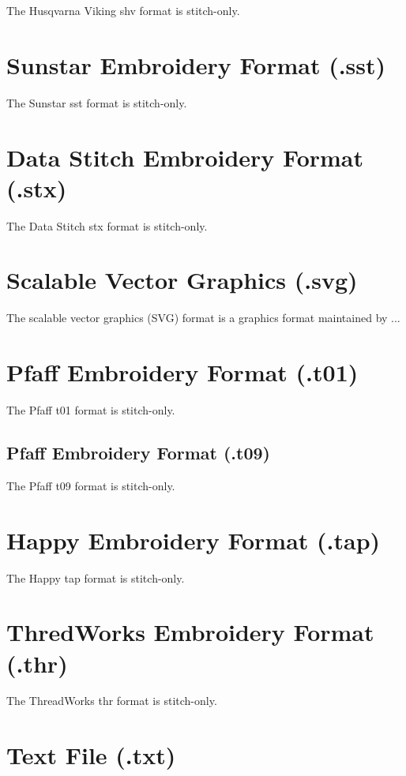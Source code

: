 \documentclass{report}
\begin{document}
The Husqvarna Viking shv format is stitch-only.

\section{Sunstar Embroidery Format (.sst)}

The Sunstar sst format is stitch-only.

\section{Data Stitch Embroidery Format (.stx)}

The Data Stitch stx format is stitch-only.

\section{Scalable Vector Graphics (.svg)}

The scalable vector graphics (SVG) format is a graphics format
maintained by ...

\section{Pfaff Embroidery Format (.t01)}

The Pfaff t01 format is stitch-only.

\subsection{Pfaff Embroidery Format (.t09)}

The Pfaff t09 format is stitch-only.

\section{Happy Embroidery Format (.tap)}

The Happy tap format is stitch-only.

\section{ThredWorks Embroidery Format (.thr)}

The ThreadWorks thr format is stitch-only.

\section{Text File (.txt)}
\end{document}
